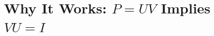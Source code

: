 \documentclass[10pt]{beamer}
\theoremstyle{definition}
\begin{document}
%
\section{Why It Works: $P = UV$ Implies $VU = I$}
\end{document}
